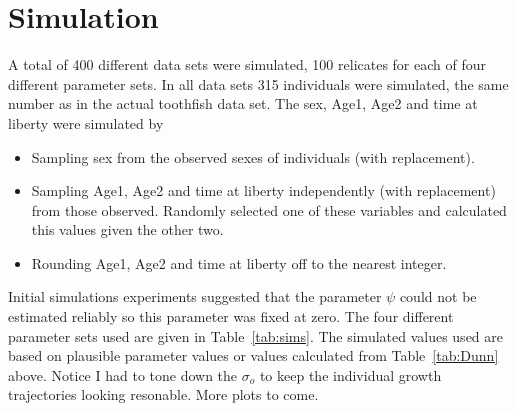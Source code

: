 \documentclass[11pt, a4paper]{article}
\begin{document}
\section{Simulation}
A total of 400 different data sets were simulated, 100 relicates for each of
four different parameter sets. In all data sets 315 individuals were simulated,
the same number as in the actual toothfish data set. The sex, Age1, Age2 and
time at liberty were simulated by
\begin{itemize}
\item Sampling sex from the observed sexes of individuals (with replacement).
\item Sampling Age1, Age2 and time at liberty independently (with replacement)
  from those observed. Randomly selected one of these variables and calculated
  this values given the other two.
\item Rounding Age1, Age2 and time at liberty off to the nearest integer.
\end{itemize}
Initial simulations experiments suggested that the parameter $\psi$ could not
be estimated reliably so this parameter was fixed at zero. The four different
parameter sets used are given in Table~\ref{tab:sims}. The simulated values
used are based on plausible parameter values or values calculated from
Table~\ref{tab:Dunn} above. Notice I had to tone down the $\sigma_o$ to keep
the individual growth trajectories looking resonable. More plots to come.
\end{document}
